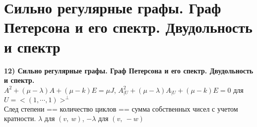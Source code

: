 \section{
 Сильно регулярные графы. Граф Петерсона и его спектр. Двудольность и спектр\\
}

\textbf{12) Сильно регулярные графы. Граф Петерсона и его спектр. Двудольность и спектр.}\\
	
	$A^2+(\mu-\lambda)A + (\mu-k)E=\mu J$, $A_{|U}^2 + (\mu-\lambda)A_{|U} + (\mu-k)E = 0$ для $U = <(1,\cdots,1)>^{\bot}$\\
	След степени == количество циклов == сумма собственных чисел с учетом кратности. $\lambda$ для $(v,\:w)$, $-\lambda$ для $(v,\:-w)$\\
	
